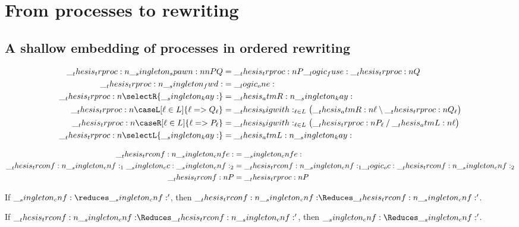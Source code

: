 \chapter{From processes to rewriting}

\section{A shallow embedding of processes in ordered rewriting}


\begin{equation*}
  \begin{aligned}
    \trproc{\spawn{P}{Q}} &= \trproc{P} \fuse \trproc{Q} \\
            \trproc{\fwd} &= \one
    \\
                         \trproc{\selectR{\kay}} &= \atmR{\kay} \\
    \trproc{\caseL[\ell \in L]{\ell => Q_{\ell}}} &= \bigwith_{\ell \in L}\bigl(\atmR{\ell} \limp \trproc{Q_{\ell}}\bigr)
    \\
    \trproc{\caseR[\ell \in L]{\ell => P_{\ell}}} &= \bigwith_{\ell \in L}\bigl(\trproc{P_{\ell}} \pmir \atmL{\ell}\bigr) \\
                         \trproc{\selectL{\kay}} &= \atmL{\kay}
  \end{aligned}
\end{equation*}

\begin{equation*}
  \begin{aligned}
    \__thesis_trconf:n {\__singleton_cnfe:} &= \__singleton_cnfe: \\
    \__thesis_trconf:n {\__singleton_cnf:_1 \__singleton_cc: \__singleton_cnf:_2} &= \__thesis_trconf:n {\__singleton_cnf:_1} \__logic_oc: \__thesis_trconf:n {\__singleton_cnf:_2} \\
    \__thesis_trconf:n {P} &= \__thesis_trproc:n {P}
  \end{aligned}
\end{equation*}

\begin{theorem}
  If $\cnf \reduces \cnf'$, then $\trconf{\cnf} \Reduces \trconf{\cnf'}$.
\end{theorem}

\begin{theorem}
  If $\trconf{\cnf} \Reduces \trconf{\cnf'}$, then $\cnf \Reduces \cnf'$.
\end{theorem}

